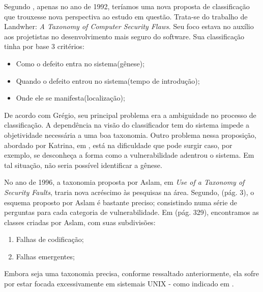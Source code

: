 			Segundo \cite{Gregio2005}, apenas no ano de 1992, teríamos uma nova proposta
			de classificação que trouxesse nova perspectiva ao estudo em questão.
			Trata-se do trabalho de Landwher: \textsl{A Taxonomy of Computer Security Flaws}.
			Seu foco estava no auxílio aos projetistas no desenvolvimento mais seguro do software.
			Sua classificação tinha por base 3 critérios:
			\begin{itemize}
				\item{Como o defeito entra no sistema(gênese);}
				\item{Quando o defeito entrou no sistema(tempo de introdução);}
				\item{Onde ele se manifesta(localização);}
			\end{itemize}
			De acordo com Grégio, seu principal problema era a ambiguidade no processo de classificação.
			A dependência na visão do classificador tem do sistema impede a objetividade necessária
			a uma boa taxonomia.
			Outro problema nessa proposição, abordado por Katrina, em \cite{Katrina2005}, está
			na dificuldade que pode surgir caso, por exemplo, se desconheça a forma como a vulnerabilidade
			adentrou o sistema. Em tal situação, não seria possível identificar a gênese.
			
			
			No ano de 1996, a taxonomia proposta por Aslam, em \textsl{Use of a Taxonomy of Security Faults},
			traria nova acréscimo às pesquisas na área. Segundo, \cite{Katrina2005}(pág. 3), o esquema
			proposto por Aslam é bastante preciso; consistindo numa série de perguntas para cada
			categoria de vulnerabilidade. Em \cite{Gregio2005}(pág. 329), encontramos as 
			classes criadas por Aslam, com suas subdivisões:
			\begin{enumerate}
				\item{Falhas de codificação;}
				\item{Falhas emergentes;}
			\end{enumerate}
			Embora seja uma taxonomia precisa, conforme ressaltado anteriormente, ela sofre
			por estar focada excessivamente em sistemais UNIX - como indicado em \cite{Katrina2005}.
			

